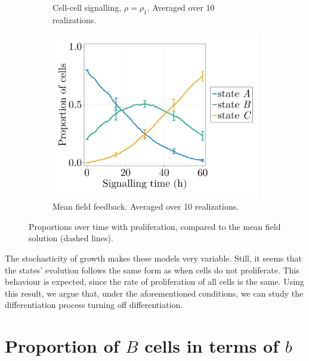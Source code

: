 \begin{figure}[ht]
\begin{subfigure}{0.47\textwidth}
        \caption{Cell-cell signalling, $\rho=\rho_1$. Averaged over 10 realizations.}
        \label{fig:props-prolif-rho1}
    \end{subfigure}
    \begin{subfigure}{0.47\textwidth}
        \centering
        \includegraphics[width=\textwidth]{figures/406/406-proportions-diffgrow-simulation-10ite-meanfield-10ite.png}
        \caption{Mean field feedback. Averaged over 10 realizations.}
    \end{subfigure}
    \caption{Proportions over time with proliferation, compared to the mean field solution (dashed lines).}
    \label{fig:props-prolif}
\end{figure}

The stochasticity of growth makes these models very variable. Still, it seems that the states' evolution follows the same form as when cells do not proliferate. This behaviour is expected, since the rate of proliferation of all cells is the same. Using this result, we argue that, under the aforementioned conditions, we can study the differentiation process turning off differentiation.


\section[Proportion of B cells in terms of b]{Proportion of $B$ cells in terms of $b$}\label{sec:phi-b}

